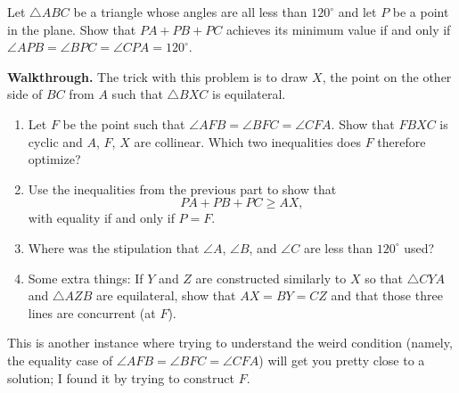 \documentclass{scrartcl}
\providecommand{\dg}{^\circ}
\providecommand{\ii}{\item}
\newenvironment{walkthrough}{\noindent\textbf{Walkthrough.}}{}
\begin{document}
\begin{example}
	Let $\triangle ABC$ be a triangle whose angles are all less than $120\dg$
	and let $P$ be a point in the plane.
	Show that $PA + PB + PC$ achieves its minimum value if and only if
	$\angle APB = \angle BPC = \angle CPA = 120\dg$.
\end{example}

\begin{walkthrough}
	The trick with this problem is to draw $X$, the point on the other side
	of $BC$ from $A$ such that $\triangle BXC$ is equilateral.
	\begin{enumerate}[label=\textbf{(\alph*)}]
		\ii Let $F$ be the point such that
		$\angle AFB = \angle BFC = \angle CFA$. Show that $FBXC$ is cyclic and
		$A$, $F$, $X$ are collinear.
		Which two inequalities does $F$ therefore optimize?
		\ii Use the inequalities from the previous part
		to show that
		\[PA + PB + PC \ge AX,\]
		with equality if and only if $P = F$.
		\ii Where was the stipulation that $\angle A$, $\angle B$, and $\angle C$
		are less than $120\dg$ used?
		\ii Some extra things: If $Y$ and $Z$ are constructed similarly to $X$
		so that $\triangle CYA$ and $\triangle AZB$ are equilateral,
		show that $AX = BY = CZ$ and that those three lines are concurrent
		(at $F$).
	\end{enumerate}
	
	This is another instance where trying to understand the weird condition
	(namely, the equality case of $\angle AFB = \angle BFC = \angle CFA$)
	will get you pretty close to a solution;
	I found it by trying to construct $F$.
\end{walkthrough}
\end{document}
